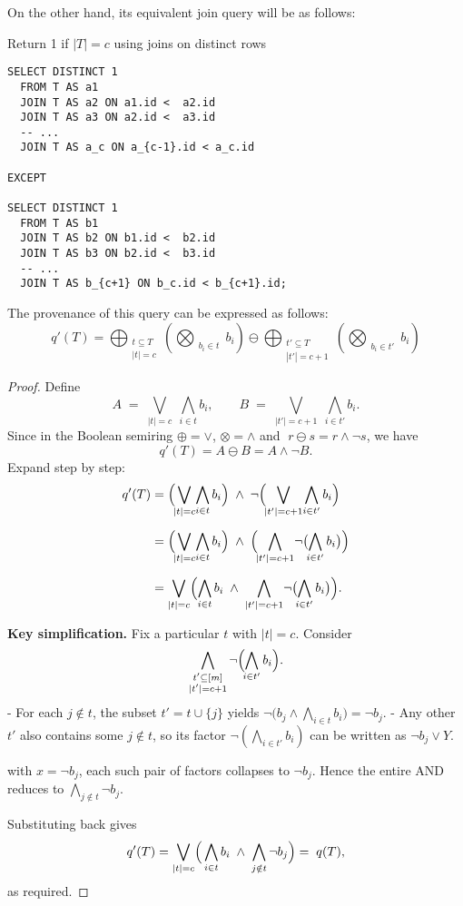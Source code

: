\documentclass[10pt,a4paper]{scrartcl}
\theoremstyle{definition}
\theoremstyle{remark}
\begin{document}
On the other hand, its equivalent join query will be as follows:

\begin{listing}[ht]
\caption{Return 1 if \(|T| = c\) using joins on distinct rows}
\begin{verbatim}
SELECT DISTINCT 1
  FROM T AS a1
  JOIN T AS a2 ON a1.id <  a2.id
  JOIN T AS a3 ON a2.id <  a3.id
  -- ...
  JOIN T AS a_c ON a_{c-1}.id < a_c.id

EXCEPT

SELECT DISTINCT 1
  FROM T AS b1
  JOIN T AS b2 ON b1.id <  b2.id
  JOIN T AS b3 ON b2.id <  b3.id
  -- ...
  JOIN T AS b_{c+1} ON b_c.id < b_{c+1}.id;
\end{verbatim}
\end{listing}

The provenance of this query can be expressed as follows:
\[
q'(T) = \bigoplus_{\substack{t\subseteq T \\ |t| = c}}\left(\bigotimes_{\substack{b_i\in t}}b_i\right) \ominus \bigoplus_{\substack{t'\subseteq T \\ |t'| = c+1}}\left(\bigotimes_{\substack{b_i\in t'}}b_i\right)
\]

\begin{proof}
Define
\[
A \;=\; \bigvee_{\lvert t\rvert = c}\;\bigwedge_{i\in t} b_i,
\qquad
B \;=\; \bigvee_{\lvert t'\rvert = c+1}\;\bigwedge_{i\in t'} b_i.
\]
Since in the Boolean semiring \(\oplus=\vee\), \(\otimes=\wedge\) and
\(\;r\ominus s = r\wedge\neg s\), we have
\[
q'(T)
= A \ominus B
= A \wedge \neg B.
\]
Expand step by step:
\begin{align*}
q'(T)
&= \Bigl(\!\bigvee_{\lvert t\rvert = c}\!\bigwedge_{i\in t}b_i\Bigr)
   \;\wedge\;
   \neg\Bigl(\!\bigvee_{\lvert t'\rvert = c+1}\!\bigwedge_{i\in t'}b_i\Bigr)\\[6pt]
&= \Bigl(\!\bigvee_{\lvert t\rvert = c}\!\bigwedge_{i\in t}b_i\Bigr)
   \;\wedge\;
   \Bigl(\!\bigwedge_{\lvert t'\rvert = c+1}\!\neg\bigl(\!\bigwedge_{i\in t'}b_i\bigr)\Bigr)\\[6pt]
&= \bigvee_{\lvert t\rvert = c}
    \Bigl(
      \bigwedge_{i\in t}b_i
      \;\wedge\;
      \bigwedge_{|t'|=c+1}\!\neg\bigl(\!\bigwedge_{i\in t'}b_i\bigr)
    \Bigr).
\end{align*}

\textbf{Key simplification.}  Fix a particular \(t\) with \(\lvert t\rvert=c\).  Consider
\[
\bigwedge_{\substack{t'\subseteq[m]\\|t'|=c+1}}
\neg\Bigl(\!\bigwedge_{i\in t'}b_i\Bigr).
\]
- For each \(j\notin t\), the subset \(t'=t\cup\{j\}\) yields
  \(\neg\bigl(b_j\wedge\bigwedge_{i\in t}b_i\bigr)=\neg b_j\).  
- Any other \(t'\) also contains some \(j\notin t\), so its factor
  \(\neg(\bigwedge_{i\in t'}b_i)\) can be written as
  \(\neg b_j\vee Y\).  

with \(x=\neg b_j\), each such pair of factors collapses to \(\neg b_j\).  Hence the entire
AND reduces to
\(\bigwedge_{j\notin t}\neg b_j\).

Substituting back gives
\[
q'(T)
=\bigvee_{\lvert t\rvert = c}
\Bigl(\,\bigwedge_{i\in t}b_i
       \;\wedge\;
       \bigwedge_{j\notin t}\neg b_j
\Bigr)
=\;q(T),
\]
as required.
\end{proof}
\end{document}
